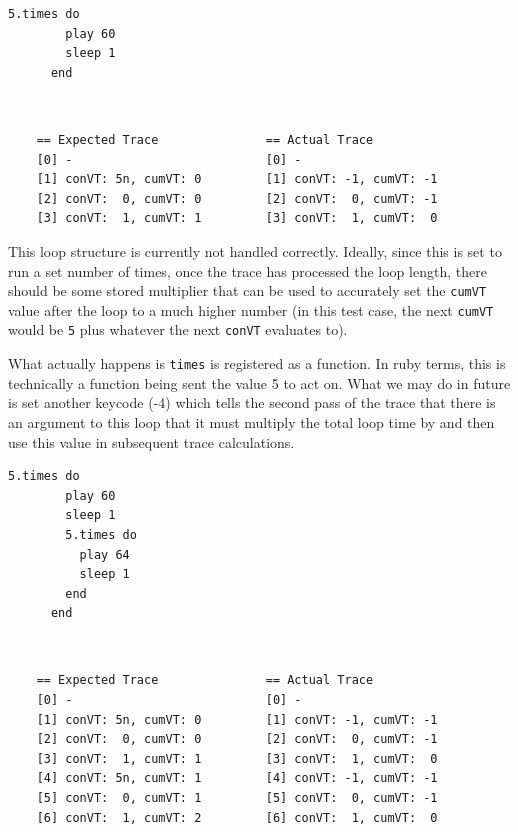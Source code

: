 \documentclass[11pt, abstracton, twoside, titlepage=true]{scrartcl}
\begin{document}
\begin{minipage}{\textwidth}
	\begin{lstlisting}[style = sonicpi]
      5.times do
        play 60
        sleep 1
      end
	\end{lstlisting}
\end{minipage}
\\
\begin{lstlisting}
    == Expected Trace               == Actual Trace
    [0] -                           [0] -
    [1] conVT: 5n, cumVT: 0         [1] conVT: -1, cumVT: -1
    [2] conVT:  0, cumVT: 0         [2] conVT:  0, cumVT: -1
    [3] conVT:  1, cumVT: 1         [3] conVT:  1, cumVT:  0
\end{lstlisting}

This loop structure is currently not handled correctly. Ideally, since this is set 
to run a set number of times, once the trace has processed the loop length, there 
should be some stored multiplier that can be used to accurately set the 
\texttt{cumVT} value after the loop to a much higher number (in this test case, the 
next \texttt{cumVT} would be \texttt{5} plus whatever the next \texttt{conVT} 
evaluates to).

What actually happens is \texttt{times} is registered as a function. In ruby terms,
this is technically a function being sent the value 5 to act on. What we may do in 
future is set another keycode (-4) which tells the second pass of the trace that 
there is an argument to this loop that it must multiply the total loop time by and
then use this value in subsequent trace calculations.

\begin{minipage}{\textwidth}
	\begin{lstlisting}[style = sonicpi]
      5.times do
        play 60
        sleep 1
        5.times do
          play 64
          sleep 1
        end
      end
	\end{lstlisting}
\end{minipage}
\\
\begin{lstlisting}
    == Expected Trace               == Actual Trace
    [0] -                           [0] -
    [1] conVT: 5n, cumVT: 0         [1] conVT: -1, cumVT: -1
    [2] conVT:  0, cumVT: 0         [2] conVT:  0, cumVT: -1
    [3] conVT:  1, cumVT: 1         [3] conVT:  1, cumVT:  0
    [4] conVT: 5n, cumVT: 1         [4] conVT: -1, cumVT: -1
    [5] conVT:  0, cumVT: 1         [5] conVT:  0, cumVT: -1
    [6] conVT:  1, cumVT: 2         [6] conVT:  1, cumVT:  0
\end{lstlisting}
\end{document}
